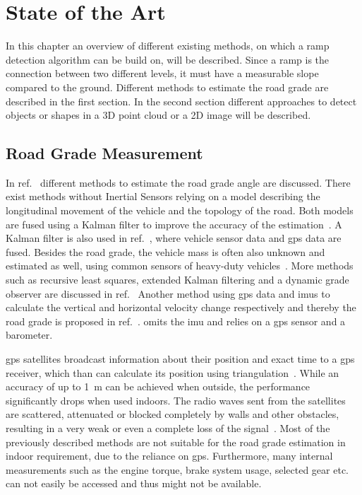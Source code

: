 \chapter{State of the Art}
\label{ch:StateOfTheArt}

In this chapter an overview of different existing methods, on which a ramp detection algorithm can be build on, will be described.
Since a ramp is the connection between two different levels, it must have a measurable slope compared to the ground.
Different methods to estimate the road grade are described in the first section.
In the second section different approaches to detect objects or shapes in a 3D point cloud or a 2D image will be described.

\section{Road Grade Measurement}
In ref.~\cite{Jauch2018} different methods to estimate the road grade angle are discussed.
There exist methods without Inertial Sensors relying on a model describing the longitudinal movement of the vehicle and the topology of the road.
Both models are fused using a Kalman filter to improve the accuracy of the estimation~\cite{Sahlholm2007}.
A Kalman filter is also used in ref.~\cite{Sahlholm2010}, where vehicle sensor data and \gls{gps} data are fused.
Besides the road grade, the vehicle mass is often also unknown and estimated as well, using common sensors of heavy-duty vehicles~\cite{Sahlholm2010, Maleej2014}.
More methods such as recursive least squares, extended Kalman filtering and a dynamic grade observer are discussed in ref.~\cite{Kidambi2014}
Another method using \gls{gps} data and \glspl{imu} to calculate the vertical and horizontal velocity change respectively and thereby the road grade is proposed in ref.~\cite{Ryu2004}.
\cite{YazdaniBoroujeni2014} omits the \gls{imu} and relies on a \gls{gps} sensor and a barometer.

\gls{gps} satellites broadcast information about their position and exact time to a \gls{gps} receiver, which than can calculate its position using triangulation~\cite{Mainetti2014}.
While an accuracy of up to \SI{1}{\metre} can be achieved when outside, the performance significantly drops when used indoors.
The radio waves sent from the satellites are scattered, attenuated or blocked completely by walls and other obstacles, resulting in a very weak or even a complete loss of the signal~\cite{Ozdenizci2015}.
Most of the previously described methods are not suitable for the road grade estimation in indoor requirement, due to the reliance on \gls{gps}.
Furthermore, many internal measurements such as the engine torque, brake system usage, selected gear etc. can not easily be accessed and thus might not be available.

